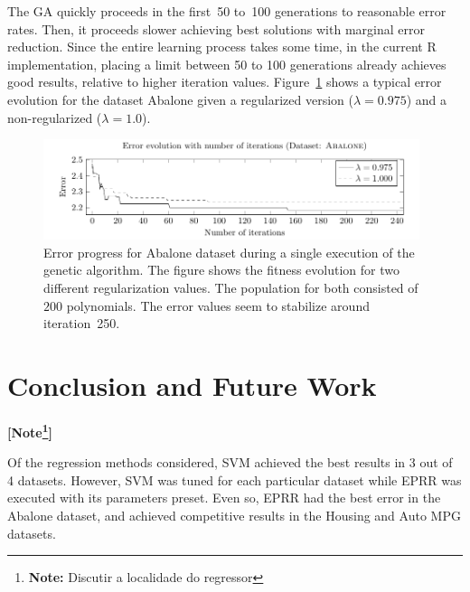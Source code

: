 \documentclass[preprint,authoryear,12pt]{elsarticle}
\newcommand{\note}[1]{\textbf{\small [Note\footnote{\textbf{Note:} #1}]}}
\begin{document}
The \ac{GA} quickly proceeds in the first~50 to~100 generations to reasonable error rates. Then, it proceeds slower achieving best solutions with marginal error reduction. Since the entire learning process takes some time, in the current R implementation, placing a limit between 50 to 100 generations already achieves good results, relative to higher iteration values. Figure~\ref{Abalone_fitnessProgress} shows a typical error evolution for the dataset Abalone given a regularized version ($\lambda = 0.975$) and a non-regularized ($\lambda = 1.0$).

\begin{figure}[tb]
\begin{center}
\includegraphics[width=0.98\textwidth]{figure_4.pdf}
\caption{Error progress for Abalone dataset during a single execution of the genetic algorithm. The figure shows the fitness evolution for two different regularization values. The population for both consisted of $200$ polynomials. The error values seem to stabilize around iteration~250.}
\label{Abalone_fitnessProgress}

\end{center}
\end{figure}

\section{Conclusion and Future Work}

\note{Discutir a localidade do regressor}


Of the regression methods considered, \ac{SVM} achieved the best results in 3 out of 4 datasets. However, \ac{SVM} was tuned for each particular dataset while \ac{EPRR} was executed with its parameters preset. Even so, \ac{EPRR} had the best error in the Abalone dataset, and achieved competitive results in the Housing and Auto MPG datasets. 
\end{document}
